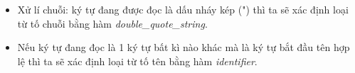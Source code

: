 \begin{itemize}


  \item Xử lí chuỗi: ký tự đang được đọc là dấu nháy kép (") thì ta sẽ xác định loại từ tố chuỗi bằng hàm \textit{double\_quote\_string}. 


  \item Nếu ký tự đang đọc là 1 ký tự bất kì nào khác mà là ký tự bắt đầu tên hợp lệ thì ta sẽ xác định loại từ tố tên bằng hàm \textit{identifier}. 


\end{itemize}
